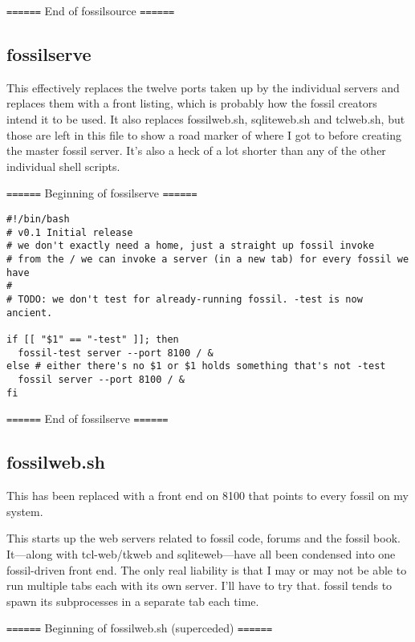 \documentclass[11pt]{article}
\begin{document}
\texttt{======} End of fossilsource \texttt{======}

\subsection*{fossilserve}
\label{sec:org9c17a63}

This effectively replaces the twelve ports taken up by the individual servers and replaces them with
a front listing, which is probably how the fossil creators intend it to be used. It also replaces
fossilweb.sh, sqliteweb.sh and tclweb.sh, but those are left in this file to show a road marker of
where I got to before creating the master fossil server. It's also a heck of a lot shorter than any
of the other individual shell scripts.

\texttt{======} Beginning of fossilserve \texttt{======}

\begin{verbatim}
#!/bin/bash
# v0.1 Initial release
# we don't exactly need a home, just a straight up fossil invoke
# from the / we can invoke a server (in a new tab) for every fossil we have
#
# TODO: we don't test for already-running fossil. -test is now ancient.

if [[ "$1" == "-test" ]]; then
  fossil-test server --port 8100 / &
else # either there's no $1 or $1 holds something that's not -test
  fossil server --port 8100 / &
fi
\end{verbatim}

\texttt{======} End of fossilserve \texttt{======}

\subsection*{fossilweb.sh}
\label{sec:orgbc55749}

This has been replaced with a front end on 8100 that points to every fossil on my system.

This starts up the web servers related to fossil code, forums and the fossil book. It—along with
tcl-web/tkweb and sqliteweb—have all been condensed into one fossil-driven front end. The only real
liability is that I may or may not be able to run multiple tabs each with its own server. I'll have
to try that. fossil tends to spawn its subprocesses in a separate tab each time.

\texttt{======} Beginning of fossilweb.sh (superceded) \texttt{======}
\end{document}
